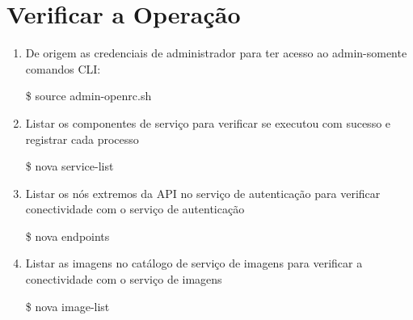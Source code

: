 \section{Verificar a Operação}

\begin{enumerate}
		\item De origem as credenciais de administrador para ter acesso ao admin-somente comandos CLI:
		\begin{snugshade}
			\$ source admin-openrc.sh
		\end{snugshade}			
		
		\item 	Listar os componentes de serviço para verificar se executou com sucesso e registrar cada processo
		\begin{snugshade}
			\$ nova service-list
		\end{snugshade} 
		
		\item Listar os nós extremos da API 	no serviço de autenticação para verificar conectividade com o serviço de autenticação
		\begin{snugshade}
			\$ nova endpoints
		\end{snugshade} 		
		
		\item Listar as imagens 	no catálogo de serviço de imagens para verificar a conectividade com o serviço de imagens
		\begin{snugshade}
			\$ nova image-list
		\end{snugshade} 			
\end{enumerate}